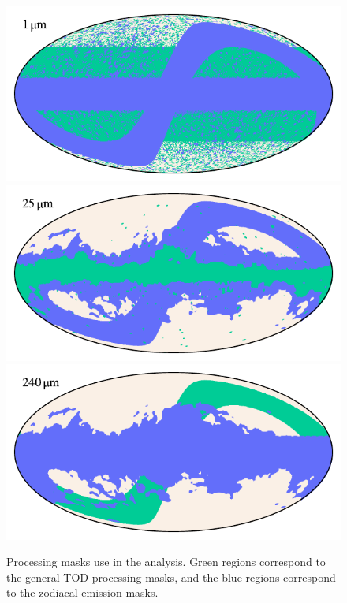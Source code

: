 \documentclass{aa}
\begin{document}
\begin{figure}
  \centering
  \includegraphics[width=\columnwidth]{figs/mask_01.pdf}
  \includegraphics[width=\columnwidth]{figs/mask_06.pdf}
  \includegraphics[width=\columnwidth]{figs/mask_10.pdf}
  \caption{Processing masks use in the analysis. Green regions correspond to the general TOD processing masks, and the blue regions correspond to the zodiacal emission masks.}
  \label{fig:masks}
\end{figure}



\end{document}

